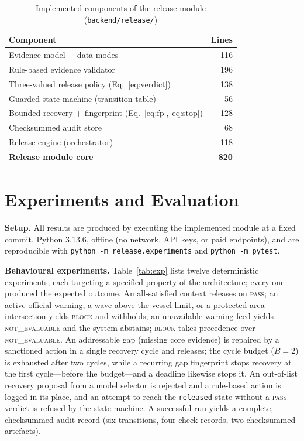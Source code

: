 \documentclass[conference]{IEEEtran}
\newcommand{\NE}{\textsc{not\_evaluable}}
\newcommand{\PASS}{\textsc{pass}}
\newcommand{\BLOCK}{\textsc{block}}
\begin{document}
\begin{table}[t]
\caption{Implemented components of the release module (\texttt{backend/release/})}
\label{tab:status}
\centering
\footnotesize
\begin{tabular}{@{}>{\raggedright\arraybackslash}p{5.5cm}@{\ }r@{}}
\toprule
\textbf{Component} & \textbf{Lines} \\
\midrule
Evidence model + data modes & 116 \\
Rule-based evidence validator & 196 \\
Three-valued release policy (Eq.~\ref{eq:verdict}) & 138 \\
Guarded state machine (transition table) & 56 \\
Bounded recovery + fingerprint (Eq.~\ref{eq:fp},\,\ref{eq:stop}) & 128 \\
Checksummed audit store & 68 \\
Release engine (orchestrator) & 118 \\
\midrule
\textbf{Release module core} & \textbf{820} \\
\bottomrule
\end{tabular}
\end{table}

\section{Experiments and Evaluation}
\label{sec:eval}
\textbf{Setup.} All results are produced by executing the implemented module at a fixed commit, Python 3.13.6, offline (no network, API keys, or paid endpoints), and are reproducible with \texttt{python -m release.experiments} and \texttt{python -m pytest}.

\textbf{Behavioural experiments.} Table~\ref{tab:exp} lists twelve deterministic experiments, each targeting a specified property of the architecture; every one produced the expected outcome. An all-satisfied context releases on \PASS{}; an active official warning, a wave above the vessel limit, or a protected-area intersection yields \BLOCK{} and withholds; an unavailable warning feed yields \NE{} and the system abstains; \BLOCK{} takes precedence over \NE{}. An addressable gap (missing core evidence) is repaired by a sanctioned action in a single recovery cycle and releases; the cycle budget ($B{=}2$) is exhausted after two cycles, while a recurring gap fingerprint stops recovery at the first cycle---before the budget---and a deadline likewise stops it. An out-of-list recovery proposal from a model selector is rejected and a rule-based action is logged in its place, and an attempt to reach the \texttt{released} state without a \PASS{} verdict is refused by the state machine. A successful run yields a complete, checksummed audit record (six transitions, four check records, two checksummed artefacts).
\end{document}
